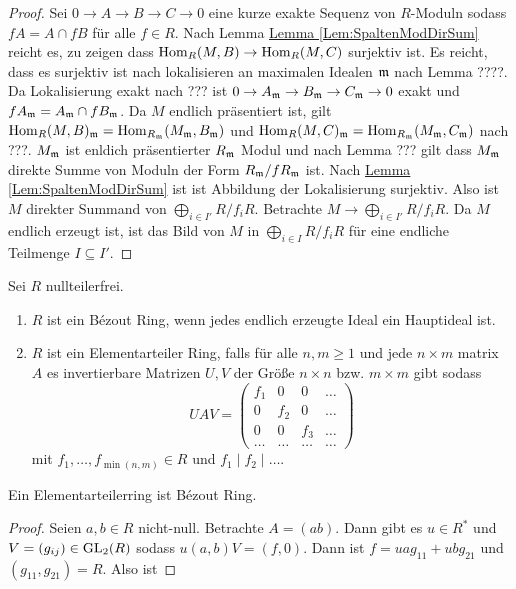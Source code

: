\begin{proof}
    Sei $0\to A\to B\to C\to 0$ eine kurze exakte Sequenz von $R$-Moduln sodass $fA=A\cap fB$ für alle $f\in R$. Nach Lemma \hyperref[Lem:SpaltenModDirSum]{Lemma \ref{Lem:SpaltenModDirSum}} reicht es, zu zeigen dass $\operatorname{Hom}_R(M,B)\to \operatorname{Hom}_R(M,C)$ surjektiv ist. Es reicht, dass es surjektiv ist nach lokalisieren an maximalen Idealen $\mathfrak{m}$ nach Lemma ????. Da Lokalisierung exakt nach ??? ist $0\to A_{\mathfrak{m}}\to B_{\mathfrak{m}}\to C_{\mathfrak{m}}\to 0$ exakt und $fA_{\mathfrak{m}}=A_{\mathfrak{m}}\cap fB_{\mathfrak{m}}$.
    Da $M$ endlich präsentiert ist, gilt $\operatorname{Hom}_R(M,B)_{\mathfrak{m}}=\operatorname{Hom}_{R_{\mathfrak{m}}}(M_{\mathfrak{m}},B_{\mathfrak{m}})$ und $\operatorname{Hom}_R(M,C)_{\mathfrak{m}}=\operatorname{Hom}_{R_{\mathfrak{m}}}(M_{\mathfrak{m}},C_{\mathfrak{m}})$ nach ???. $M_{\mathfrak{m}}$ ist enldich präsentierter $R_{\mathfrak{m}}$ Modul und nach Lemma ??? gilt dass $M_{\mathfrak{m}}$ direkte Summe von Moduln der Form $R_{\mathfrak{m}}/fR_{\mathfrak{m}}$ ist. Nach \hyperref[Lem:SpaltenModDirSum]{Lemma \ref{Lem:SpaltenModDirSum}} ist ist Abbildung der Lokalisierung surjektiv. Also ist $M$ direkter Summand von $\bigoplus_{i\in I'}R/f_iR$. Betrachte $M\to\bigoplus_{i\in I'}R/f_iR$. Da $M$ endlich erzeugt ist, ist das Bild von $M$ in $\bigoplus_{i\in I}R/f_iR$ für eine endliche Teilmenge $I\subseteq I'$.
\end{proof}
\begin{Def}
    Sei $R$ nullteilerfrei.
    \begin{enumerate}
        \item $R$ ist ein Bézout Ring, wenn jedes endlich erzeugte Ideal ein Hauptideal ist.
        \item $R$ ist ein Elementarteiler Ring, falls für alle $n,m\geq 1$ und jede $n\times m$ matrix $A$ es invertierbare Matrizen $U,V$ der Größe $n\times n$ bzw. $m\times m$ gibt sodass $$UAV=\begin{pmatrix}
            f_1 & 0& 0& \dots\\ 0& f_2 & 0& \dots \\ 0&0 & f_3& \dots\\ \dots & \dots & \dots & \dots
        \end{pmatrix}$$ mit $f_1,\dots,f_{\min(n,m)}\in R$ und $f_1\mid f_2\mid\dots$.
    \end{enumerate}
\end{Def}
\begin{Lemma}
    Ein Elementarteilerring ist Bézout Ring.
\end{Lemma}
\begin{proof}
    Seien $a,b\in R$ nicht-null. Betrachte $A=(a b)$. Dann gibt es $u\in R^*$ und $V=(g_{ij})\in \operatorname{GL}_2(R)$ sodass $u(a,b)V=(f,0)$.
    Dann ist $f=uag_{11}+ubg_{21}$ und $(g_{11},g_{21})=R$. Also ist 

\end{proof}

